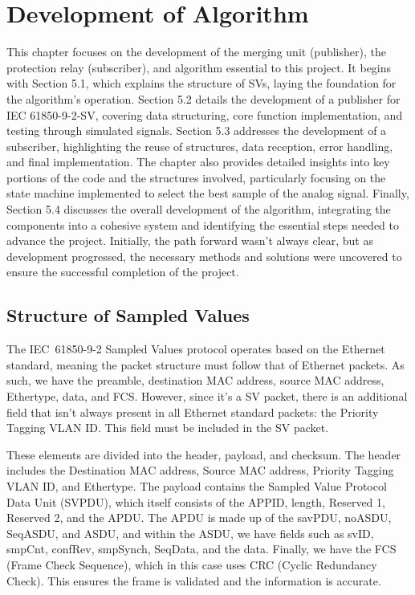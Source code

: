 
\chapter{Development of Algorithm} %

\label{chap:Chapter5} %


This chapter focuses on the development of the merging unit (publisher), the protection relay (subscriber), and algorithm essential to this project. It begins with Section 5.1, which explains the structure of SVs, laying the foundation for the algorithm's operation. Section 5.2 details the development of a publisher for IEC 61850-9-2-SV, covering data structuring, core function implementation, and testing through simulated signals. Section 5.3 addresses the development of a subscriber, highlighting the reuse of structures, data reception, error handling, and final implementation. The chapter also provides detailed insights into key portions of the code and the structures involved, particularly focusing on the state machine implemented to select the best sample of the analog signal. Finally, Section 5.4 discusses the overall development of the algorithm, integrating the components into a cohesive system and identifying the essential steps needed to advance the project. Initially, the path forward wasn't always clear, but as development progressed, the necessary methods and solutions were uncovered to ensure the successful completion of the project.

\section{Structure of Sampled Values}

\label{sec:Structure_of_Sampled_Values}
The IEC~61850-9-2 Sampled Values protocol operates based on the Ethernet standard, meaning the packet structure must follow that of Ethernet packets. As such, we have the preamble, destination MAC address, source MAC address, Ethertype, data, and FCS. However, since it's a SV packet, there is an additional field that isn't always present in all Ethernet standard packets: the Priority Tagging VLAN ID. This field must be included in the SV packet.

These elements are divided into the header, payload, and checksum. The header includes the Destination MAC address, Source MAC address, Priority Tagging VLAN ID, and Ethertype. The payload contains the Sampled Value Protocol Data Unit (SVPDU), which itself consists of the APPID, length, Reserved 1, Reserved 2, and the APDU. The APDU is made up of the savPDU, noASDU, SeqASDU, and ASDU, and within the ASDU, we have fields such as svID, smpCnt, confRev, smpSynch, SeqData, and the data. Finally, we have the FCS (Frame Check Sequence), which in this case uses CRC (Cyclic Redundancy Check). This ensures the frame is validated and the information is accurate.

